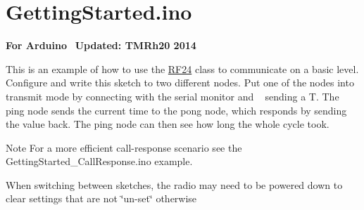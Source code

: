 \hypertarget{GettingStarted_8ino-example}{}\section{Getting\+Started.\+ino}
{\bfseries For Arduino}~\newline
 {\bfseries Updated\+: T\+M\+Rh20 2014 }~\newline


This is an example of how to use the \hyperlink{classRF24}{R\+F24} class to communicate on a basic level. Configure and write this sketch to two different nodes. Put one of the nodes into \textquotesingle{}transmit\textquotesingle{} mode by connecting with the serial monitor and ~\newline
 sending a \textquotesingle{}T\textquotesingle{}. The ping node sends the current time to the pong node, which responds by sending the value back. The ping node can then see how long the whole cycle took. ~\newline
 \begin{DoxyNote}{Note}
For a more efficient call-\/response scenario see the Getting\+Started\+\_\+\+Call\+Response.\+ino example. 

When switching between sketches, the radio may need to be powered down to clear settings that are not \char`\"{}un-\/set\char`\"{} otherwise
\end{DoxyNote}

